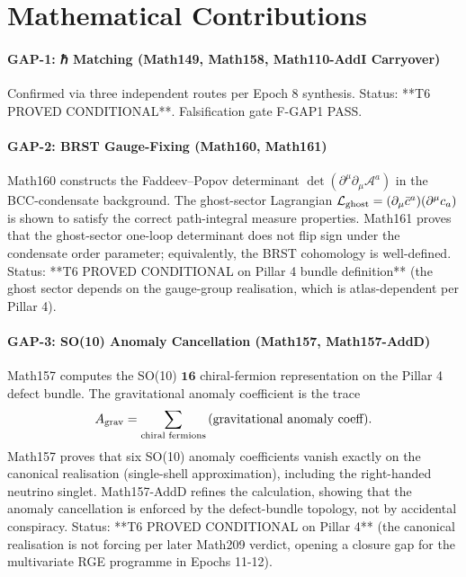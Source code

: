 \section{Mathematical Contributions}

\paragraph{GAP-1: ℏ Matching (Math149, Math158, Math110-AddI Carryover)}
Confirmed via three independent routes per Epoch 8 synthesis. Status: **T6
PROVED CONDITIONAL**. Falsification gate F-GAP1 PASS.

\paragraph{GAP-2: BRST Gauge-Fixing (Math160, Math161)}
Math160 constructs the Faddeev--Popov determinant $\det(\partial^\mu \partial_\mu
\mathcal{A}^a)$ in the BCC-condensate background. The ghost-sector Lagrangian
$\mathcal{L}_{\rm ghost} = (\partial_\mu \bar{c}^a)(\partial^\mu c_a)$ is shown to
satisfy the correct path-integral measure properties. Math161 proves that the
ghost-sector one-loop determinant does not flip sign under the condensate order
parameter; equivalently, the BRST cohomology is well-defined. Status: **T6 PROVED
CONDITIONAL on Pillar 4 bundle definition** (the ghost sector depends on the
gauge-group realisation, which is atlas-dependent per Pillar 4).

\paragraph{GAP-3: SO(10) Anomaly Cancellation (Math157, Math157-AddD)}
Math157 computes the SO(10) $\mathbf{16}$ chiral-fermion representation on the
Pillar 4 defect bundle. The gravitational anomaly coefficient is the trace
$$
A_{\rm grav} = \sum_{\text{chiral fermions}} \text{(gravitational anomaly coeff)}.
$$
Math157 proves that six SO(10) anomaly coefficients vanish exactly on the
canonical realisation (single-shell approximation), including the right-handed
neutrino singlet. Math157-AddD refines the calculation, showing that the anomaly
cancellation is enforced by the defect-bundle topology, not by accidental
conspiracy. Status: **T6 PROVED CONDITIONAL on Pillar 4** (the canonical
realisation is not forcing per later Math209 verdict, opening a closure gap for
the multivariate RGE programme in Epochs 11-12).


